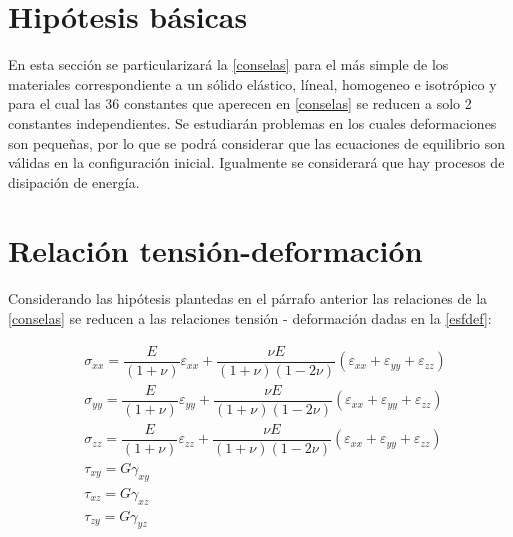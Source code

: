 \documentclass[../notas medios.tex]{subfiles}
\begin{document}
\section{Hipótesis básicas}

En esta sección se particularizará la \cref{conselas} para el más simple de los materiales correspondiente a un sólido elástico, líneal, homogeneo e isotrópico y para el cual las 36 constantes que aperecen en \cref{conselas} se reducen a solo 2 constantes independientes. Se estudiarán problemas en los cuales deformaciones son pequeñas, por lo que se podrá considerar que las ecuaciones de equilibrio son válidas en la configuración inicial. Igualmente se considerará que hay procesos de disipación de energía. 

\section{Relación tensión-deformación}

Considerando las hipótesis plantedas en el párrafo anterior las relaciones de la  \cref{conselas} se reducen a las relaciones tensión - deformación dadas en la  \cref{esfdef}: 

\begin{equation} \label{esfdef}
\begin{split}
& {\sigma_{xx}} = \dfrac{E}{(1 + \nu)} \varepsilon_{xx} + \dfrac{\nu E}{(1 + \nu)(1-2 \nu)} (\varepsilon_{xx} + \varepsilon_{yy} + \varepsilon_{zz}) \\
& {\sigma _{yy}} =\dfrac{E}{(1 + \nu)} \varepsilon_{yy} + \dfrac{\nu E}{(1 + \nu)(1-2 \nu)} (\varepsilon_{xx} + \varepsilon_{yy} + \varepsilon_{zz}) \\
& {\sigma _{zz}} = \dfrac{E}{(1 + \nu)} \varepsilon_{zz} + \dfrac{\nu E}{(1 + \nu)(1-2 \nu)} (\varepsilon_{xx} + \varepsilon_{yy} + \varepsilon_{zz}) \\
& {\tau _{xy}} = {G} \gamma_{xy}  \\
& {\tau _{xz}} = {G} \gamma_{xz}  \\
& {\tau _{zy}} ={G} \gamma_{yz} 	
\end{split}
\end{equation}
\end{document}
